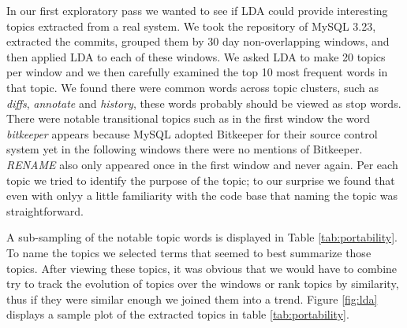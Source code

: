 \documentclass[times, 10pt,twocolumn]{article}
\begin{document}
In our first exploratory pass we wanted to see if LDA could provide
interesting topics extracted from a real system. We took the
repository of MySQL 3.23, extracted the commits, grouped them by 30
day non-overlapping windows, and then applied LDA to each of these
windows. We asked LDA to make 20 topics per window and we then
carefully examined the top 10 most frequent words in that topic.  We
found there were common words across topic clusters, such as
\emph{diffs}, \emph{annotate} and \emph{history}, these words probably should
be viewed as stop words. There were notable transitional topics such
as in the first window the word \emph{bitkeeper} appears because MySQL
adopted Bitkeeper for their source control system yet in the following
windows there were no mentions of Bitkeeper. \emph{RENAME} also only
appeared once in the first window and never again. Per each topic we
tried to identify the purpose of the topic; to our surprise we found
that even with onlyy a little familiarity with the code base that
naming the topic was straightforward.

A sub-sampling of the notable topic words is displayed in Table
\ref{tab:portability}.  To name the topics we selected terms that
seemed to best summarize those topics.  After viewing these topics, it was
obvious that we would have to combine try to track the evolution of
topics over the windows or rank topics by similarity, thus if they
were similar enough we joined them into a trend. Figure \ref{fig:lda}
displays a sample plot of the extracted topics in table
\ref{tab:portability}.


\end{document}
